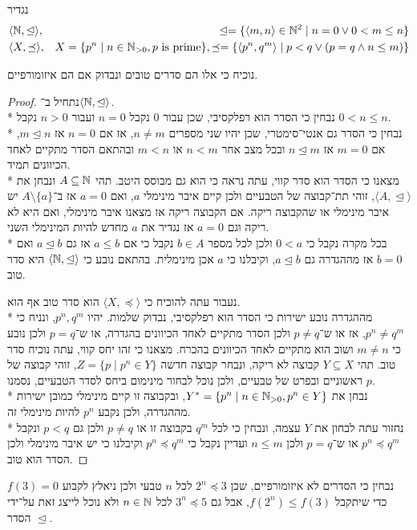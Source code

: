 \Question{}
נגדיר
\begin{align*}
	& \langle \mathbb{N}, \trianglelefteq \rangle,
	& \trianglelefteq = \{ \langle m, n \rangle \in \mathbb{N}^2 \mid n = 0 \lor 0 < m \le n \} \\
	& \langle X, \preceq \rangle,
	& X = \{ p^n \mid n \in \mathbb{N}_{>0}, p \text{ is prime}\}, \preceq = \{ \langle p^n, q^m \rangle \mid p < q \lor (p = q \land n \le m) \}
\end{align*}

\Subquestion{}
נוכיח כי אלו הם סדרים טובים ונבדוק אם הם איזומורפיים.
\begin{proof}
	נתחיל ב־$\langle \mathbb{N}, \trianglelefteq \rangle$. \\*
	נבחין כי הסדר הוא רפלקסיבי, שכן עבור $0$ נקבל $n = 0$ ועבור $n > 0$ נקבל $0 < n \le n$. \\*
	נבחין כי הסדר גם אנטי־סימטרי, שכן יהיו שני מספרים $n \ne m$, אז אם $n = 0$ אז $m \trianglelefteq n$, אם $m = 0$ אז $n \trianglelefteq m$ ובכל מצב אחר $n < m$ או $m < n$ ובהתאם הסדר מתקיים לאחד הכיוונים תמיד. \\*
	מצאנו כי הסדר הוא סדר קווי, עתה נראה כי הוא גם מבוסס היטב.
	תהי $A \subseteq \mathbb{N}$ ונבחן את $\langle A, \trianglelefteq \rangle$, זוהי תת־קבוצה של הטבעיים ולכן קיים איבר מינימלי $a$, ואם $a = 0$ אז ב־$A \setminus \{ a\}$ יש איבר מינימלי או שהקבוצה ריקה.
	אם הקבוצה ריקה אז מצאנו איבר מינימלי, ואם היא לא ריקה וגם $a = 0$ אז נגדיר את $a$ מחדש להיות המינימלי השני. \\*
	בכל מקרה נקבל כי $0 < a$ ולכן לכל מספר $b \in A$ נקבל כי אם $a \le b$ אז גם $a \trianglelefteq b$ ואם $b = 0$ אז מההגדרה גם $a \trianglelefteq b$, וקיבלנו כי $a$ אכן מינימלית. 
	בהתאם נובע כי $\langle \mathbb{N}, \trianglelefteq \rangle$ היא סדר טוב.

	נעבור עתה להוכיח כי $\langle X, \preceq \rangle$ הוא סדר טוב אף הוא. \\*
	מההגדרה נובע ישירות כי הסדר הוא רפלקסיבי, נבדוק שלמות.
	יהיו $p^n, q^m$, ונניח כי $p^n \ne q^m$, אז או ש־$p \ne q$ ולכן הסדר מתקיים לאחד הכיוונים בהגדרה, או ש־$p = q$ ולכן נובע כי $m \ne n$ ושוב הוא מתקיים לאחד הכיוונים בהכרח.
	מצאנו כי זהו יחס קווי, עתה נוכיח סדר טוב.
	תהי $Y \subseteq X$ קבוצה לא ריקה, ונבחר קבוצה חדשה $Z = \{ p \mid p^n \in Y \}$, זוהי קבוצה של ראשוניים ובפרט של טבעיים, ולכן נוכל לבחור מינימום ביחס לסדר הטבעיים, נסמנו $p$. \\*
	נבחן את $Y^* = \{ p^n \mid n \in \mathbb{N}_{>0}, p^n \in Y \}$, ובקבוצה זו קיים מינימלי כמובן ישירות מההגדרה, ולכן נקבע $p^n$ להיות מינימלי זה. \\*
	נחזור עתה לבחון את $Y$ עצמה, ונבחין כי לכל $q^m$ בקבוצה זו או $p \ne q$ ולכן גם $p < q$ ונקבל $p^n \preceq q^m$ או ש־$p = q$ ולכן $n \le m$ ועדיין נקבל כי $p^n \preceq q^m$ וקיבלנו כי יש איבר מינימלי ולכן הסדר הוא טוב.
\end{proof}
נבחין כי הסדרים לא איזומורפיים, שכן $2^n \preceq 3$ לכל $n$ טבעי ולכן ניאלץ לקבוע $f(3) = 0$ כדי שיתקבל $f(2^n) \le f(3)$, אבל גם $3^n \preceq 5$ לכל $n \in \mathbb{N}$ ולא נוכל לייצג זאת על־ידי הסדר $\trianglelefteq$.

